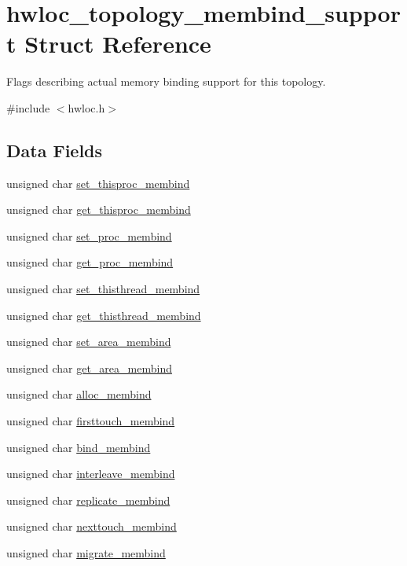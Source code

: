 \hypertarget{a00025}{
\section{hwloc\_\-topology\_\-membind\_\-support Struct Reference}
\label{a00025}
}


Flags describing actual memory binding support for this topology.  




{\ttfamily \#include $<$hwloc.h$>$}

\subsection*{Data Fields}
\begin{DoxyCompactItemize}
\item 
unsigned char \hyperlink{a00025_a36b3e388df9c6a249427cab7e3724749}{set\_\-thisproc\_\-membind}
\item 
unsigned char \hyperlink{a00025_a3fd51e6fa5f0dd800322301b46b08559}{get\_\-thisproc\_\-membind}
\item 
unsigned char \hyperlink{a00025_a756f44912894b176bf979a1b65f12aac}{set\_\-proc\_\-membind}
\item 
unsigned char \hyperlink{a00025_a9880cd2d605e316fc020167c49ca69ad}{get\_\-proc\_\-membind}
\item 
unsigned char \hyperlink{a00025_a0697af2e41f2e82b8ce71e3cc13f7eac}{set\_\-thisthread\_\-membind}
\item 
unsigned char \hyperlink{a00025_a63b0b2e26157b472f5717ee93cc7c535}{get\_\-thisthread\_\-membind}
\item 
unsigned char \hyperlink{a00025_a476c06f96b65c08b287cf2369966123b}{set\_\-area\_\-membind}
\item 
unsigned char \hyperlink{a00025_a0a84e24a06f2fa487fe8c9605c6f68b3}{get\_\-area\_\-membind}
\item 
unsigned char \hyperlink{a00025_ae551abb27d2aa9ce008583488b845b98}{alloc\_\-membind}
\item 
unsigned char \hyperlink{a00025_a221098c339dbfab27bd2c9f5d32f123b}{firsttouch\_\-membind}
\item 
unsigned char \hyperlink{a00025_ae7cdb1f1b5f0242a69f85b5a5538c764}{bind\_\-membind}
\item 
unsigned char \hyperlink{a00025_a3c44c6012860bbeba8a0f4c19710858d}{interleave\_\-membind}
\item 
unsigned char \hyperlink{a00025_afe608fb85eb2aa9706221ccb5fc4d415}{replicate\_\-membind}
\item 
unsigned char \hyperlink{a00025_ab0921af6e0cd6975812a80b8e5c7435c}{nexttouch\_\-membind}
\item 
unsigned char \hyperlink{a00025_aafa7683871a6a760246f9b35209caec5}{migrate\_\-membind}
\end{DoxyCompactItemize}


